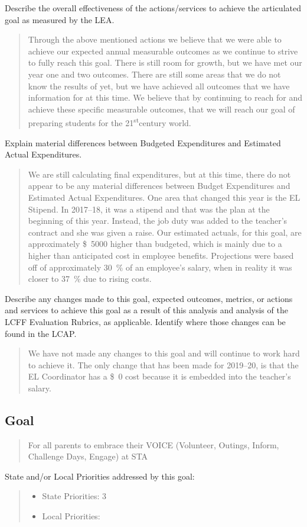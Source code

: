 \documentclass{article}
\newcommand{\st}{\textsuperscript{st}}
\newcommand{\dollar}[1]{\SI{#1}[\$]{}}
\newcounter{goal}[section]
\newcommand{\Goal}[3]{
	\refstepcounter{goal}
	\subsection{Goal \arabic{goal}}
	\begin{quote}
		#1
	\end{quote}
	State and/or Local Priorities addressed by this goal:
	\begin{quote}
		\begin{itemize}[label={}]
		\item State Priorities: #2
		\item Local Priorities: #3
		\end{itemize}
	\end{quote}
}
\newcounter{action}[goal]
\begin{document}
Describe the overall effectiveness of the actions/services to achieve the articulated goal as measured by the LEA.
\begin{quote}
	Through the above mentioned actions we believe that we were able to achieve our expected annual measurable outcomes as we continue to strive to fully reach this goal. There is still room for growth, but we have met our year one and two outcomes. There are still some areas that we do not know the results of yet, but we have achieved all outcomes that we have information for at this time. We believe that by continuing to reach for and achieve these specific measurable outcomes, that we will reach our goal of preparing students for the 21\st century world.
\end{quote}

Explain material differences between Budgeted Expenditures and Estimated Actual Expenditures.
\begin{quote}
	We are still calculating final expenditures, but at this time, there do not appear to be any material differences between Budget Expenditures and Estimated Actual Expenditures. One area that changed this year is the EL Stipend. In 2017--18, it was a stipend and that was the plan at the beginning of this year. Instead, the job duty was added to the teacher's contract and she was given a raise. Our estimated actuals, for this goal, are approximately \dollar{5000} higher than budgeted, which is mainly due to a higher than anticipated cost in employee benefits. Projections were based off of approximately \SI{30}{\percent} of an employee's salary, when in reality it was closer to \SI{37}{\percent} due to rising costs.
\end{quote}

Describe any changes made to this goal, expected outcomes, metrics, or actions and services to achieve this goal as a result of this analysis and analysis of the LCFF Evaluation Rubrics, as applicable. Identify where those changes can be found in the LCAP.
\begin{quote}
	We have not made any changes to this goal and will continue to work hard to achieve it. The only change that has been made for 2019--20, is that the EL Coordinator has a \dollar{0} cost because it is embedded into the teacher's salary.
\end{quote}

\Goal
	{For all parents to embrace their VOICE (Volunteer, Outings, Inform, Challenge Days, Engage) at STA}
	{3}
	{}
\end{document}

